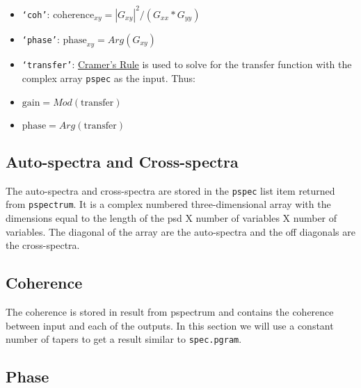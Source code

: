 \documentclass[11pt]{article}\usepackage[]{graphicx}\usepackage[]{xcolor}
\newcommand{\Rcmd}[1]{\texttt{#1}}
\begin{document}
\begin{itemize}

\item \Rcmd{`coh'}: $ \text{coherence}_{xy}  = |G_{xy}|^2 / (G_{xx} * G_{yy})$

\item \Rcmd{`phase'}: $ \text{phase}_{xy} = Arg(G_{xy})$

\item \Rcmd{`transfer'}: \href{https://en.wikipedia.org/wiki/Cramer%27s_rule}{Cramer's Rule} is used to solve for the transfer function with the complex array \Rcmd{pspec} as the input. Thus:

\item $ \text{gain} = Mod(\text{transfer}) $
\item $ \text{phase} = Arg(\text{transfer}) $

\end{itemize}



\subsection{Auto-spectra and Cross-spectra}

The auto-spectra and cross-spectra are stored in the \Rcmd{pspec} list item returned from \Rcmd{pspectrum}.  It is a complex numbered three-dimensional array with the dimensions equal to the length of the psd X number of variables X number of variables.  The diagonal of the array are the auto-spectra and the off diagonals are the cross-spectra.





\newpage 

\subsection{Coherence}

The coherence is stored in result from pspectrum and contains the coherence between input and each of the outputs. In this section we will use a constant number of tapers to get a result similar to \Rcmd{spec.pgram}.   











\subsection{Phase}
\end{document}
